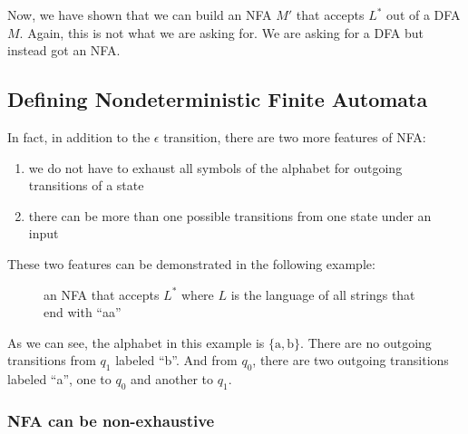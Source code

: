 \documentclass[11pt]{article}
\begin{document}
Now, we have shown that we can build an NFA $M'$ that accepts $L^\ast$ out of
a DFA $M$. Again, this is not what we are asking for. We are asking for a DFA
but instead got an NFA.

\subsection{Defining Nondeterministic Finite Automata}

In fact, in addition to the $\epsilon$ transition, there are two more features
of NFA:
\begin{enumerate}
\item we do not have to exhaust all symbols of the alphabet for outgoing
transitions of a state
\item there can be more than one possible transitions from one state under an input
\end{enumerate}

These two features can be demonstrated in the following example:

\begin{figure}[ht]
    \centering
    \caption{an NFA that accepts $L^\ast$ where $L$ is the language of all
    strings that end with ``aa''}
    \label{fig:fig11}
\end{figure}

As we can see, the alphabet in this example is $\{\mathrm{a},\mathrm{b}\}$. There are no outgoing
transitions from $q_1$ labeled ``b''. And from $q_0$, there are two outgoing
transitions labeled ``a'', one to $q_0$ and another to $q_1$.

\subsubsection{NFA can be non-exhaustive}
\end{document}
